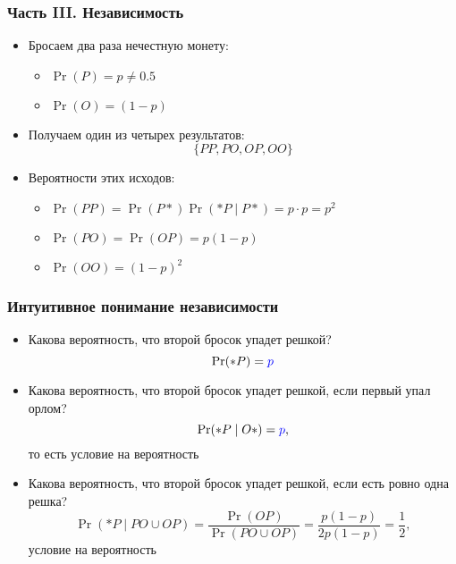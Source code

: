 \documentclass[hyperref=unicode,graphics=pdflatex,13pt,xcolor={usenames,dvipsnames}]{beamer}
\newcommand\hl[1]{{\color{blue}{#1}}}
\newcommand\red[1]{{\color{red}{#1}}}
\newcommand\pitem{\pause\item}
\begin{document}
\begin{frame}
  \frametitle{Часть III. Независимость}
  \begin{itemize}
    \item Бросаем два раза нечестную монету: 
    \begin{itemize}
      \item $\Pr(P) = p \ne 0.5$
      \item $\Pr(O) = (1 - p)$
    \end{itemize} 
    \item Получаем один из четырех результатов: $$\{PP, PO, OP, OO\}$$
    \item Вероятности этих исходов:
      \begin{itemize}
        \item $\Pr(PP) = \Pr(P*) \Pr(*P \mid P*) = p \cdot p = p^2$
        \item $\Pr(PO) = \Pr(OP) = p(1 - p)$
        \item $\Pr(OO) = (1 - p)^2$
      \end{itemize}
  \end{itemize}
\end{frame}

\begin{frame}
  \frametitle{Интуитивное понимание независимости}
  \begin{itemize}
    \item Какова вероятность, что второй бросок упадет решкой? \pause 
    \[\Pr(*P) = \hl{p}\]
    \pitem Какова вероятность, что второй бросок упадет решкой, если первый упал орлом? \pause 
    \[\Pr(*P \mid O*) = \hl{p},\] то есть условие \hl{не влияет} на вероятность
    \pitem Какова вероятность, что второй бросок упадет решкой, если есть ровно одна решка? \pause 
    \[\Pr(*P \mid PO \cup OP) = \frac{\Pr(OP)}{\Pr(PO \cup OP)} = \frac{p(1 - p)}{2p(1 - p)} = \frac{1}{2},\]
    условие \red{влияет} на вероятность
  \end{itemize}
\end{frame}
\end{document}
